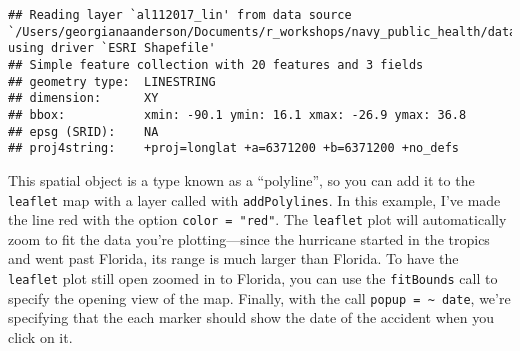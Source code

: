 \documentclass[]{tufte-book}
\newenvironment{Shaded}{}{}
\newcommand{\DataTypeTok}[1]{\textcolor[rgb]{0.56,0.13,0.00}{#1}}
\newcommand{\DecValTok}[1]{\textcolor[rgb]{0.25,0.63,0.44}{#1}}
\newcommand{\FloatTok}[1]{\textcolor[rgb]{0.25,0.63,0.44}{#1}}
\newcommand{\KeywordTok}[1]{\textcolor[rgb]{0.00,0.44,0.13}{\textbf{#1}}}
\newcommand{\NormalTok}[1]{#1}
\newcommand{\OperatorTok}[1]{\textcolor[rgb]{0.40,0.40,0.40}{#1}}
\newcommand{\StringTok}[1]{\textcolor[rgb]{0.25,0.44,0.63}{#1}}
\begin{document}
\begin{Shaded}
\end{Shaded}

\begin{verbatim}
## Reading layer `al112017_lin' from data source `/Users/georgianaanderson/Documents/r_workshops/navy_public_health/data/al112017_best_track' using driver `ESRI Shapefile'
## Simple feature collection with 20 features and 3 fields
## geometry type:  LINESTRING
## dimension:      XY
## bbox:           xmin: -90.1 ymin: 16.1 xmax: -26.9 ymax: 36.8
## epsg (SRID):    NA
## proj4string:    +proj=longlat +a=6371200 +b=6371200 +no_defs
\end{verbatim}

This spatial object is a type known as a ``polyline'', so you can add it to the \texttt{leaflet} map with a
layer called with \texttt{addPolylines}. In this example, I've made the line red with the option
\texttt{color\ =\ "red"}. The \texttt{leaflet} plot will automatically zoom to fit the data you're plotting---since
the hurricane started in the tropics and went past Florida, its range is much larger than Florida.
To have the \texttt{leaflet} plot still open zoomed in to Florida, you can use the \texttt{fitBounds} call to
specify the opening view of the map. Finally, with the call \texttt{popup\ =\ \textasciitilde{}\ date}, we're specifying that
the each marker should show the date of the accident when you click on it.

\begin{Shaded}
\end{Shaded}
\end{document}
